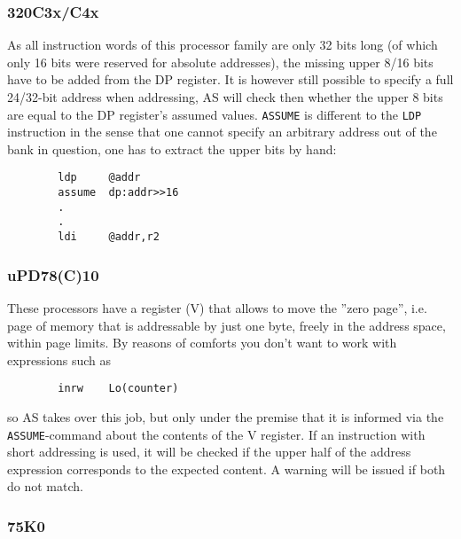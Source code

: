 \documentclass[12pt,twoside]{report}
\newcommand{\tty}[1]{{\tt #1}}
\begin{document}

\subsubsection{320C3x/C4x}

As all instruction words of this processor family are only 32 bits
long (of which only 16 bits were reserved for absolute addresses),
the missing upper 8/16 bits have to be added from the DP register.  It
is however still possible to specify a full 24/32-bit address when
addressing, AS will check then whether the upper 8 bits are equal to
the DP register's assumed values.  \tty{ASSUME} is different to the
\tty{LDP} instruction in the sense that one cannot specify an arbitrary
address out of the bank in question, one has to extract the upper bits by
hand:
\begin{verbatim}
        ldp     @addr
        assume  dp:addr>>16
        .
        .
        ldi     @addr,r2
\end{verbatim}


\subsubsection{uPD78(C)10}

These processors have a register (V) that allows to move the ''zero
page'', i.e. page of memory that is addressable by just one byte,
freely in the address space, within page limits.  By reasons of
comforts you don't want to work with expressions such as
\begin{verbatim}
        inrw    Lo(counter)
\end{verbatim}
so AS takes over this job, but only under the premise that it is informed
via the \tty{ASSUME}-command about the contents of the V register.  If an
instruction with short addressing is used, it will be checked if the upper
half of the address expression corresponds to the expected content.  A
warning will be issued if both do not match.


\subsubsection{75K0}
\end{document}

